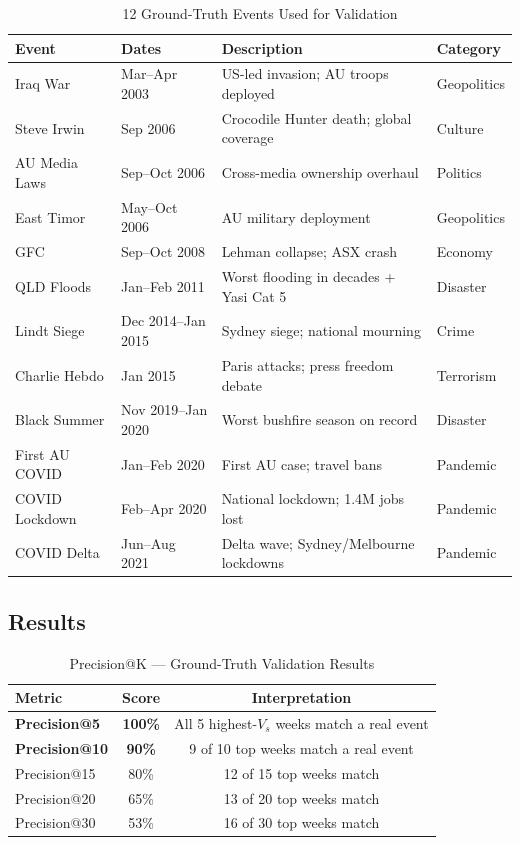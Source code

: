 \documentclass[12pt,a4paper]{article}
\begin{document}
\begin{table}[H]
\centering
\caption{12 Ground-Truth Events Used for Validation}
\begin{tabular}{llp{5.5cm}l}
\toprule
\textbf{Event} & \textbf{Dates} & \textbf{Description} & \textbf{Category} \\
\midrule
Iraq War         & Mar--Apr 2003 & US-led invasion; AU troops deployed & Geopolitics \\
Steve Irwin      & Sep 2006      & Crocodile Hunter death; global coverage & Culture \\
AU Media Laws    & Sep--Oct 2006 & Cross-media ownership overhaul & Politics \\
East Timor       & May--Oct 2006 & AU military deployment & Geopolitics \\
GFC              & Sep--Oct 2008 & Lehman collapse; ASX crash & Economy \\
QLD Floods       & Jan--Feb 2011 & Worst flooding in decades + Yasi Cat 5 & Disaster \\
Lindt Siege      & Dec 2014--Jan 2015 & Sydney siege; national mourning & Crime \\
Charlie Hebdo    & Jan 2015      & Paris attacks; press freedom debate & Terrorism \\
Black Summer     & Nov 2019--Jan 2020 & Worst bushfire season on record & Disaster \\
First AU COVID   & Jan--Feb 2020 & First AU case; travel bans & Pandemic \\
COVID Lockdown   & Feb--Apr 2020 & National lockdown; 1.4M jobs lost & Pandemic \\
COVID Delta      & Jun--Aug 2021 & Delta wave; Sydney/Melbourne lockdowns & Pandemic \\
\bottomrule
\end{tabular}
\label{tab:events}
\end{table}

\subsection{Results}

\begin{table}[H]
\centering
\caption{Precision@K — Ground-Truth Validation Results}
\begin{tabular}{lcc}
\toprule
\textbf{Metric} & \textbf{Score} & \textbf{Interpretation} \\
\midrule
\textbf{Precision@5}  & \textbf{100\%} & All 5 highest-$V_s$ weeks match a real event \\
\textbf{Precision@10} & \textbf{90\%}  & 9 of 10 top weeks match a real event \\
Precision@15          & 80\%   & 12 of 15 top weeks match \\
Precision@20          & 65\%   & 13 of 20 top weeks match \\
Precision@30          & 53\%   & 16 of 30 top weeks match \\
\bottomrule
\end{tabular}
\label{tab:precision}
\end{table}
\end{document}
